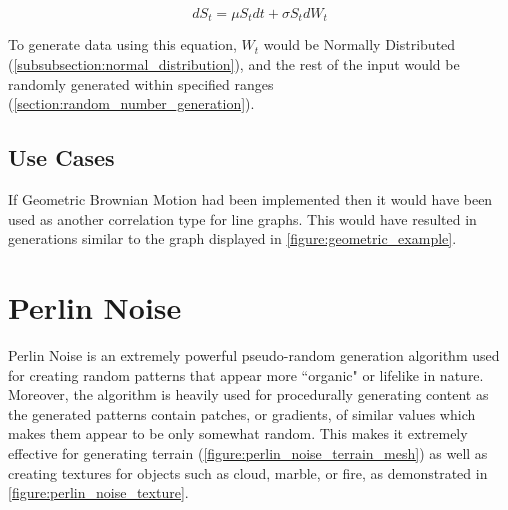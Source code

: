 \begin{displaymath}
dS_{t} = \mu S_{t}dt + \sigma S_{t}dW_{t}
\end{displaymath}

\hfill

To generate data using this equation, \(W_t\) would be Normally Distributed (\autoref{subsubsection:normal_distribution}), and the rest of the input would be randomly generated within specified ranges (\autoref{section:random_number_generation}).

\subsection{Use Cases}
If Geometric Brownian Motion had been implemented then it would have been used as another correlation type for line graphs. This would have resulted in generations similar to the graph displayed in \autoref{figure:geometric_example}.

\section{Perlin Noise}
Perlin Noise is an extremely powerful pseudo-random generation algorithm used for creating random patterns that appear more ``organic" or lifelike in nature. Moreover, the algorithm is heavily used for procedurally generating content as the generated patterns contain patches, or gradients, of similar values which makes them appear to be only somewhat random. This makes it extremely effective for generating terrain (\autoref{figure:perlin_noise_terrain_mesh}) as well as creating textures for objects such as cloud, marble, or fire, as demonstrated in \autoref{figure:perlin_noise_texture}.

\hfill

